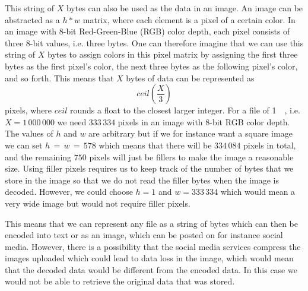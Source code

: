 
This string of $X$ bytes can also be used as the data in an image. An image can be abstracted as a $h * w$ matrix, where each element is a pixel of a certain color. In an image with 8-bit Red-Green-Blue (RGB) color depth, each pixel consists of three 8-bit values, i.e. three bytes. One can therefore imagine that we can use this string of $X$ bytes to assign colors in this pixel matrix by assigning the first three bytes as the first pixel's color, the next three bytes as the following pixel's color, and so forth. This means that $X$ bytes of data can be represented as 
$$ceil(\frac{X}{3})$$ 
pixels, where $ceil$ rounds a float to the closest larger integer. For a file of \SI{1}{\mega\byte}, i.e. $X = 1\,000\,000$ we need $333\,334$ pixels in an image with 8-bit RGB color depth. The values of $h$ and $w$ are arbitrary but if we for instance want a square image we can set $ h\,=\,w\,=\,578$ which means that there will be $334\,084$ pixels in total, and the remaining $750$ pixels will just be fillers to make the image a reasonable size. Using filler pixels requires us to keep track of the number of bytes that we store in the image so that we do not read the filler bytes when the image is decoded. However, we could choose $h = 1$ and $w = 333\,334$ which would mean a very wide image but would not require filler pixels. 

This means that we can represent any file as a string of bytes which can then be encoded into text or as an image, which can be posted on for instance social media. However, there is a possibility that the social media services compress the images uploaded which could lead to data loss in the image, which would mean that the decoded data would be different from the encoded data. In this case we would not be able to retrieve the original data that was stored.